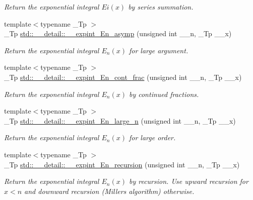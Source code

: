 \begin{DoxyCompactItemize}
\begin{DoxyCompactList}\small\item\em Return the exponential integral $ Ei(x) $ by series summation. \end{DoxyCompactList}\item 
{\footnotesize template$<$typename \+\_\+\+Tp $>$ }\\\+\_\+\+Tp \hyperlink{namespacestd_1_1____detail_a3b9f1cc6d66cbd705f52c520eb96b467}{std\+::\+\_\+\+\_\+detail\+::\+\_\+\+\_\+expint\+\_\+\+En\+\_\+asymp} (unsigned int \+\_\+\+\_\+n, \+\_\+\+Tp \+\_\+\+\_\+x)
\begin{DoxyCompactList}\small\item\em Return the exponential integral $ E_n(x) $ for large argument. \end{DoxyCompactList}\item 
{\footnotesize template$<$typename \+\_\+\+Tp $>$ }\\\+\_\+\+Tp \hyperlink{namespacestd_1_1____detail_a34e1eb1248cdad9ceed2aa33732de6ea}{std\+::\+\_\+\+\_\+detail\+::\+\_\+\+\_\+expint\+\_\+\+En\+\_\+cont\+\_\+frac} (unsigned int \+\_\+\+\_\+n, \+\_\+\+Tp \+\_\+\+\_\+x)
\begin{DoxyCompactList}\small\item\em Return the exponential integral $ E_n(x) $ by continued fractions. \end{DoxyCompactList}\item 
{\footnotesize template$<$typename \+\_\+\+Tp $>$ }\\\+\_\+\+Tp \hyperlink{namespacestd_1_1____detail_a77400748c1315de9be10fa5e469df64b}{std\+::\+\_\+\+\_\+detail\+::\+\_\+\+\_\+expint\+\_\+\+En\+\_\+large\+\_\+n} (unsigned int \+\_\+\+\_\+n, \+\_\+\+Tp \+\_\+\+\_\+x)
\begin{DoxyCompactList}\small\item\em Return the exponential integral $ E_n(x) $ for large order. \end{DoxyCompactList}\item 
{\footnotesize template$<$typename \+\_\+\+Tp $>$ }\\\+\_\+\+Tp \hyperlink{namespacestd_1_1____detail_a9b0a2050324390fb6c4a584170289a99}{std\+::\+\_\+\+\_\+detail\+::\+\_\+\+\_\+expint\+\_\+\+En\+\_\+recursion} (unsigned int \+\_\+\+\_\+n, \+\_\+\+Tp \+\_\+\+\_\+x)
\begin{DoxyCompactList}\small\item\em Return the exponential integral $ E_n(x) $ by recursion. Use upward recursion for $ x < n $ and downward recursion (Miller\textquotesingle{}s algorithm) otherwise. \end{DoxyCompactList}\item 

\end{DoxyCompactItemize}
